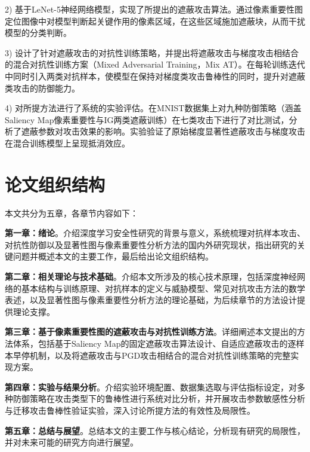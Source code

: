 2) 基于LeNet-5神经网络模型，实现了所提出的遮蔽攻击算法。通过像素重要性图定位图像中对模型判断起关键作用的像素区域，在这些区域施加遮蔽块，从而干扰模型的分类判断。

3) 设计了针对遮蔽攻击的对抗性训练策略，并提出将遮蔽攻击与梯度攻击相结合的混合对抗性训练方案（Mixed Adversarial Training，Mix AT）。在每轮训练迭代中同时引入两类对抗样本，使模型在保持对梯度类攻击鲁棒性的同时，提升对遮蔽类攻击的防御能力。

4) 对所提方法进行了系统的实验评估。在MNIST数据集上对九种防御策略（涵盖Saliency Map像素重要性与IG两类遮蔽训练）在七类攻击下进行了对比测试，分析了遮蔽参数对攻击效果的影响。实验验证了原始梯度显著性遮蔽攻击与梯度攻击在混合训练模型上呈现抵消效应\cite{Duan2023InequalityPI}。


\section{论文组织结构}

本文共分为五章，各章节内容如下：

\textbf{第一章：绪论}。介绍深度学习安全性研究的背景与意义，系统梳理对抗样本攻击、对抗性防御以及显著性图与像素重要性分析方法的国内外研究现状，指出研究的关键问题并概述本文的主要工作，最后给出论文组织结构。

\textbf{第二章：相关理论与技术基础}。介绍本文所涉及的核心技术原理，包括深度神经网络的基本结构与训练原理、对抗样本的定义与威胁模型、常见对抗攻击方法的数学表述，以及显著性图与像素重要性分析方法的理论基础，为后续章节的方法设计提供理论支撑。

\textbf{第三章：基于像素重要性图的遮蔽攻击与对抗性训练方法}。详细阐述本文提出的方法体系，包括基于Saliency Map的固定遮蔽攻击算法设计、自适应遮蔽攻击的逐样本早停机制，以及将遮蔽攻击与PGD攻击相结合的混合对抗性训练策略的完整实现方案。

\textbf{第四章：实验与结果分析}。介绍实验环境配置、数据集选取与评估指标设定，对多种防御策略在攻击类型下的鲁棒性进行系统对比分析，并开展攻击参数敏感性分析与迁移攻击鲁棒性验证实验，深入讨论所提方法的有效性及局限性。

\textbf{第五章：总结与展望}。总结本文的主要工作与核心结论，分析现有研究的局限性，并对未来可能的研究方向进行展望。
